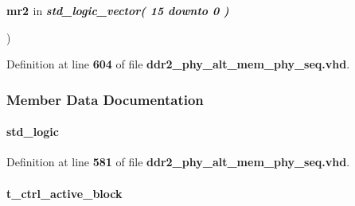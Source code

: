 {\begin{DoxyParamCaption}
\item[{}]{{\bfseries {\bfseries {\bf mr2}} \textcolor{vhdlchar}{ }}\textcolor{stringliteral}{in} {\em {\bfseries \textcolor{vhdlchar}{ }\textcolor{comment}{std\+\_\+logic\+\_\+vector}\textcolor{vhdlchar}{(}\textcolor{vhdlchar}{ } \textcolor{vhdldigit}{15} \textcolor{vhdlchar}{ }\textcolor{keywordflow}{downto}\textcolor{vhdlchar}{ }\textcolor{vhdlchar}{ } \textcolor{vhdldigit}{0} \textcolor{vhdlchar}{)}\textcolor{vhdlchar}{ }\textcolor{vhdlchar}{ }\textcolor{vhdlchar}{ }}}}
\end{DoxyParamCaption}
)\hspace{0.3cm}{\ttfamily [Function]}}\label{classddr2__phy__alt__mem__phy__record__pkg_aec119ba07f7f75c235c6a96772286830}


Definition at line {\bf 604} of file {\bf ddr2\+\_\+phy\+\_\+alt\+\_\+mem\+\_\+phy\+\_\+seq.\+vhd}.



\subsubsection{Member Data Documentation}
\paragraph[{ac\+\_\+1t}]{ {\bfseries \textcolor{comment}{std\+\_\+logic}\textcolor{vhdlchar}{ }} \hspace{0.3cm}{\ttfamily [Record]}}\label{classddr2__phy__alt__mem__phy__record__pkg_a86634c9dfef82f6fe9b99660f3018eb3}


Definition at line {\bf 581} of file {\bf ddr2\+\_\+phy\+\_\+alt\+\_\+mem\+\_\+phy\+\_\+seq.\+vhd}.

\paragraph[{active\+\_\+block}]{ {\bfseries {\bfseries {\bf t\+\_\+ctrl\+\_\+active\+\_\+block}} \textcolor{vhdlchar}{ }} \hspace{0.3cm}{\ttfamily [Record]}}\label{classddr2__phy__alt__mem__phy__record__pkg_a36e182ac82af0c111cbc524195aee48f}


